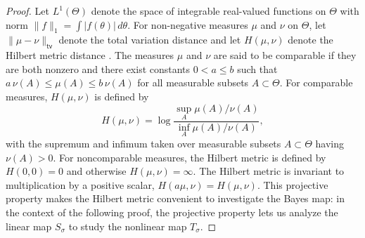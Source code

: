 \documentclass[11pt]{article}
\begin{document}
\begin{proof}
Let $L^1(\Theta)$ denote the space of integrable real-valued functions on $\Theta$ with norm $\|f\|_1=\int|f(\theta)|\, d\theta$. 
For non-negative measures $\mu$ and $\nu$ on $\Theta$, let $\|\mu-\nu\|_{\textsf{tv}}$  denote the total variation distance and let $H(\mu,\nu)$ denote the Hilbert metric distance \cite{eveson95,legland04}.  
The measures $\mu$ and $\nu$ are said to be comparable if they are both nonzero and there exist constants $0<a\le b$ such that $a\,\nu(A)\le \mu(A)\le b\,\nu(A)$ for all measurable subsets $A\subset\Theta$. 
For comparable measures, $H(\mu,\nu)$ is defined by
\begin{equation}
H(\mu,\nu)=\log\frac{ \sup_A \mu(A)/\nu(A)}{ \inf_A \mu(A)/\nu(A)},
\end{equation}
with the supremum and infimum taken over measurable subsets $A\subset\Theta$ having $\nu(A)>0$. 
For noncomparable measures, the Hilbert metric is defined by $H(0,0)=0$ and otherwise $H(\mu,\nu)=\infty$.
The Hilbert metric is invariant to multiplication by a positive scalar, $H(a\mu,\nu)=H(\mu,\nu)$. 
This projective property makes the Hilbert metric convenient to investigate the Bayes map: in the context of the following proof, the projective property lets us analyze the linear map $S_\sigma$ to study the nonlinear map $T_\sigma$.
%


\end{proof}
\end{document}
